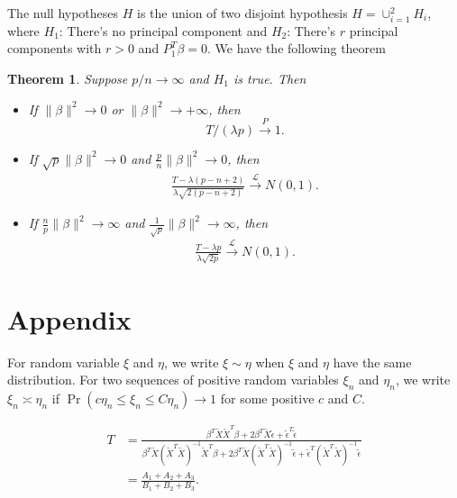 \documentclass[review]{elsarticle}
\theoremstyle{plain}
\newtheorem{theorem}{\quad\quad Theorem}
\theoremstyle{definition}
\theoremstyle{remark}
\begin{document}
The null hypotheses $H$ is the union of two disjoint hypothesis $H=\cup_{i=1}^2 H_i$, where $H_1$: There's no principal component and $H_2$:  There's $r$ principal components with $r>0$ and $P_1^T\beta=0$. We have the following theorem

\begin{theorem}
    Suppose $p/n \to  \infty$ and $H_1$ is true. Then
    \begin{itemize}
        \item
            If $\|\beta\|^2\to 0$ or $\|\beta\|^2\to +\infty$, then
            \begin{equation}
                T/(\lambda p) \xrightarrow{P} 1.
            \end{equation}
\item
If $\sqrt{p}\|\beta\|^2\to 0$ and $\frac{p}{n}\|\beta\|^2\to 0$, then
\begin{equation}
    \begin{aligned}
        \frac{T-\lambda (p-n+2)}{\lambda\sqrt{2(p-n+2)}
        }\xrightarrow{\mathcal{L}}N(0,1).
    \end{aligned}
\end{equation}
        \item
If $\frac{n}{p}\|\beta\|^2\to \infty$ and $\frac{1}{\sqrt{p}}\|\beta\|^2\to \infty$, then
\begin{equation}
    \begin{aligned}
        \frac{T
    -\lambda p}{\lambda\sqrt{2p}
        }\xrightarrow{\mathcal{L}}N(0,1).
    \end{aligned}
\end{equation}
    \end{itemize}
\end{theorem}



\section{Appendix}

For random variable $\xi$ and $\eta$, we write $\xi\sim \eta$ when $\xi$ and $\eta$ have the same distribution. For two sequences of positive random variables $\xi_n$ and $\eta_n$, we write $\xi_n\asymp \eta_n$ if $\Pr(c\eta_n\leq\xi_n\leq C\eta_n)\to 1$ for some positive $c$ and $C$.

\begin{equation}\label{Tdecom}
    \begin{aligned}
        T&=\frac{\beta^T \tilde{X}\tilde{X}^T \beta+
        2\beta^T \tilde{X}\tilde{\epsilon}+
        \tilde{\epsilon}^T\tilde{\epsilon}
    }{\beta^T \tilde{X}{(\tilde{X}^T\tilde{X})}^{-1}\tilde{X}^T \beta+
        2\beta^T \tilde{X}{(\tilde{X}^T\tilde{X})}^{-1}\tilde{\epsilon}+
        \tilde{\epsilon}^T{(\tilde{X}^T\tilde{X})}^{-1}\tilde{\epsilon}
    }\\
        &=\frac{A_1+A_2+A_3}{B_1+B_2+B_3}.
    \end{aligned}
\end{equation}
\end{document}
